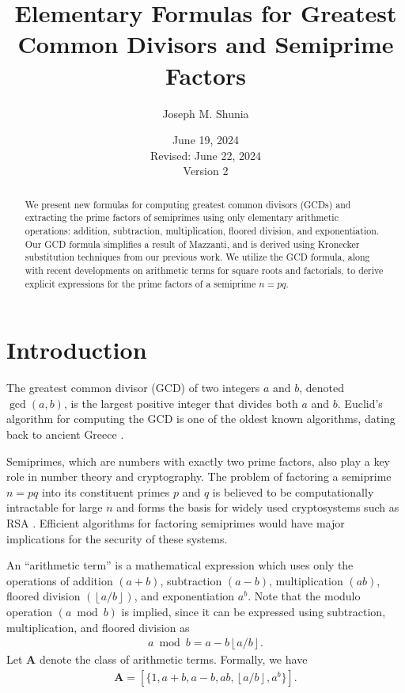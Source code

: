\documentclass[11pt,reqno]{article}
\title{Elementary Formulas for Greatest Common Divisors and Semiprime Factors}
\author{Joseph M. Shunia}
\date{June 19, 2024 \\ \small Revised: June 22, 2024 \\ Version 2 \normalsize}
\theoremstyle{plain}
\theoremstyle{definition}
\newcommand{\floor}[1]{\left\lfloor #1 \right\rfloor}
\begin{document}
\maketitle

\begin{abstract}
We present new formulas for computing greatest common divisors (GCDs) and extracting the prime factors of semiprimes using only elementary arithmetic operations: addition, subtraction, multiplication, floored division, and exponentiation. Our GCD formula simplifies a result of Mazzanti, and is derived using Kronecker substitution techniques from our previous work. We utilize the GCD formula, along with recent developments on arithmetic terms for square roots and factorials, to derive explicit expressions for the prime factors of a semiprime $n=p q$.
\end{abstract}

\section{Introduction}

The greatest common divisor (GCD) of two integers $a$ and $b$, denoted $\gcd(a,b)$, is the largest positive integer that divides both $a$ and $b$. Euclid's algorithm for computing the GCD is one of the oldest known algorithms, dating back to ancient Greece \cite{knuth1997art}.

Semiprimes, which are numbers with exactly two prime factors, also play a key role in number theory and cryptography. The problem of factoring a semiprime $n=p q$ into its constituent primes $p$ and $q$ is believed to be computationally intractable for large $n$ and forms the basis for widely used cryptosystems such as RSA \cite{rivest1978rsa}. Efficient algorithms for factoring semiprimes would have major implications for the security of these systems.

An ``arithmetic term'' is a mathematical expression which uses only the operations of addition $(a+b)$, subtraction $(a-b)$, multiplication $(ab)$, floored division $(\floor{a/b})$, and exponentiation $a^b$. Note that the modulo operation $(a \bmod b)$ is implied, since it can be expressed using subtraction, multiplication, and floored division as
\begin{align*}
    a \bmod b = a - b \floor{a/b} .
\end{align*}
Let $\textbf{A}$ denote the class of arithmetic terms. Formally, we have
\begin{align*}
\textbf{A} = [ \{ 1, a+b, a-b, ab, \floor{a/b}, a^b \} ].
\end{align*}
\end{document}
